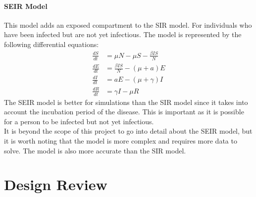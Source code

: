 \documentclass{report}
\begin{document}
\subsubsection{SEIR Model}
This model adds an exposed compartment to the SIR model. For individuals who have been infected but are not yet infectious. The model is represented by the following differential equations:
\begin{align}
\frac{dS}{dt} &= \mu N - \mu S - \frac{\beta IS}{N} \label{seir_model_dS} \\
\frac{dE}{dt} &= \frac{\beta IS}{N} - (\mu + a)E \label{seir_model_dE} \\
\frac{dI}{dt} &= aE - (\mu + \gamma)I \label{seir_model_dI} \\
\frac{dR}{dt} &= \gamma I - \mu R \label{seir_model_dR}
\end{align}
The SEIR model is better for simulations than the SIR model since it takes into account the incubation period of the disease. This is important as it is possible for a person to be infected but not yet infectious.\\
It is beyond the scope of this project to go into detail about the SEIR model, but it is worth noting that the model is more complex and requires more data to solve. The model is also more accurate than the SIR model.

\chapter{Design Review}
\end{document}
